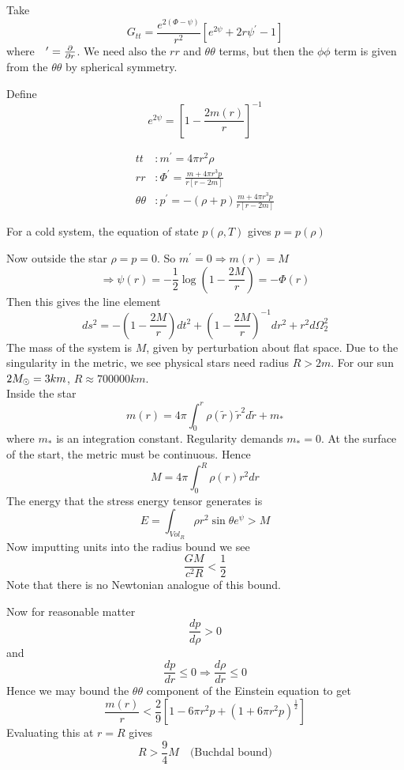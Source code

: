 \documentclass{article}
\begin{document}
\begin{example}
Take 
\[
G_{tt} = \frac{e^{2(\Phi-\psi)}}{r^2} \left[ e^{2\psi} + 2r\psi^\prime-1 \right]
\]
where $\phantom{\psi}^\prime = \frac{\partial}{\partial r}$. We need also the $rr$ and $\theta\theta$ terms, but then the $\phi\phi$ term is given from the $\theta\theta$ by spherical symmetry. 
\begin{definition}[m(r)]
Define 
\[
e^{2\psi} = \left[ 1- \frac{2m(r)}{r} \right]^{-1}
\]
\end{definition}
\begin{align*}
    tt &: m^\prime = 4\pi r^2 \rho \\ 
    rr &: \Phi^\prime = \frac{m+4\pi r^3 p}{r[r-2m]} \\
    \theta\theta &: p^\prime = -(\rho+p) \frac{m+4\pi r^3 p}{r[r-2m]}
\end{align*}
\begin{definition}
For a cold system, the equation of state $p(\rho,T)$ gives $p=p(\rho)$
\end{definition}
Now outside the star $\rho=p=0$. So $m^\prime = 0 \Rightarrow m(r) = M$
\[
\Rightarrow \psi(r) = -\frac{1}{2}\log(1-\frac{2M}{r}) = -\Phi(r)
\]
Then this gives the line element 
\[
ds^2 = -(1-\frac{2M}{r}) dt^2 + (1-\frac{2M}{r})^{-1}dr^2 + r^2 d\Omega_2^2
\]
The mass of the system is $M$, given by perturbation about flat space. Due to the singularity in the metric, we see physical stars need radius $R>2m$. For our sun $2M_\odot = 3km$, $R\approx 700000 km$. \\
Inside the star 
\[
m(r) = 4\pi \int_0^r \rho(\tilde{r}) \tilde{r}^2 d\tilde{r} + m_\ast
\]
where $m_\ast$ is an integration constant. Regularity demands $m_\ast = 0$. At the surface of the start, the metric must be continuous. Hence 
\[
M = 4\pi \int_0^R \rho(r) r^2 dr
\]
The energy that the stress energy tensor generates is 
\[
E = \int_{Vol_R} \rho r^2 \sin\theta e^\psi > M 
\]
Now imputting units into the radius bound we see 
\[
\frac{GM}{c^2 R} < \frac{1}{2}
\]
Note that there is no Newtonian analogue of this bound. 
\end{example}
Now for reasonable matter 
\[
\frac{dp}{d\rho} > 0
\]
and 
\[
\frac{dp}{dr}\leq 0 \Rightarrow \frac{d\rho}{dr} \leq 0
\]
Hence we may bound the $\theta\theta$ component of the Einstein equation  to get 
\[
\frac{m(r)}{r} < \frac{2}{9} \left[ 1 - 6\pi r^2 p + (1 + 6\pi r^2 p)^\frac{1}{2} \right]
\]
Evaluating this at $r=R$ gives 
\[
R > \frac{9}{4} M \quad \text{(Buchdal bound)}
\]
\end{document}
